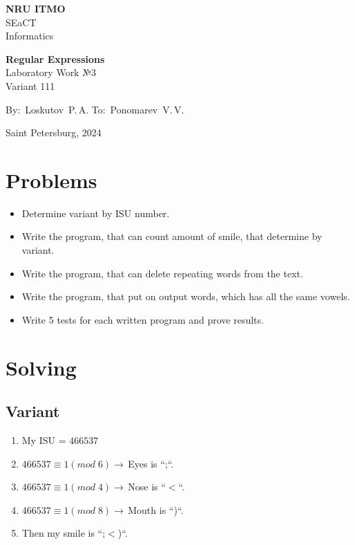 \documentclass[12pt]{article}
\begin{document}
	\begin{center}
		\thispagestyle{empty}
		\LARGE
		\textbf{NRU ITMO}\\
		SEaCT\\
		Informatics\\
	
		\vspace{7cm}
		
		\huge
		
		\textbf{Regular Expressions}\\
		Laboratory Work №3\\
		\vspace{1cm}
		\Large
		Variant 111
		
		\LARGE
		\vspace{5cm}
		\vbox{
			\hfill
			\vbox{
				\hbox{By: Loskutov P.\,A.}
				\hbox{To: Ponomarev V.\,V.}
			}
		} 
		
		\vspace{2.5cm}
		Saint Petersburg, 2024
		\newpage
		\tableofcontents
	\end{center}
	\newpage
	\Large
	\section{\LARGE Problems} 
	\begin{itemize}
		\item Determine variant by ISU number.
		\item Write the program, that can count amount of smile, that determine by variant.
		\item Write the program, that can delete repeating words from the text.
		\item Write the program, that put on output words, which has all the same vowels.
		\item Write 5 tests for each written program and prove results.
	\end{itemize}
	\newpage
	\section{\LARGE Solving}
	\subsection{\LARGE Variant}
	\begin{enumerate}
		\item My ISU = \(466537\)
		\item \(466537 \equiv 1(mod\; 6)\rightarrow\,\)Eyes is ``;``.
		\item \(466537 \equiv 1(mod\; 4)\rightarrow\,\)Nose is ``\(<\)``.
		\item \(466537 \equiv 1(mod\; 8)\rightarrow\,\)Mouth is ``)``.
		\item Then my smile is ``;\(<\))``.
	\end{enumerate}
\end{document}
